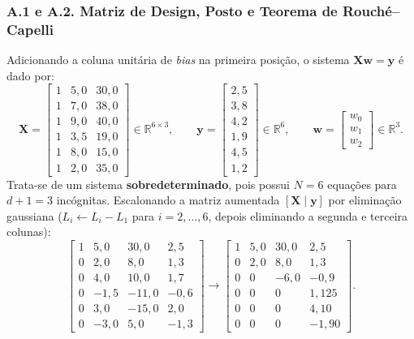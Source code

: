 \documentclass[11pt,a4paper]{article}
\begin{document}
\subsubsection*{A.1 e A.2. Matriz de Design, Posto e Teorema de Rouché--Capelli}
Adicionando a coluna unitária de \textit{bias} na primeira posição, o sistema $\mathbf{X}\mathbf{w} = \mathbf{y}$ é dado por:
\[
\mathbf{X} = \begin{bmatrix}
1 & 5{,}0 & 30{,}0 \\
1 & 7{,}0 & 38{,}0 \\
1 & 9{,}0 & 40{,}0 \\
1 & 3{,}5 & 19{,}0 \\
1 & 8{,}0 & 15{,}0 \\
1 & 2{,}0 & 35{,}0
\end{bmatrix} \in \mathbb{R}^{6 \times 3}, \qquad
\mathbf{y} = \begin{bmatrix} 2{,}5 \\ 3{,}8 \\ 4{,}2 \\ 1{,}9 \\ 4{,}5 \\ 1{,}2 \end{bmatrix} \in \mathbb{R}^6, \qquad
\mathbf{w} = \begin{bmatrix} w_0 \\ w_1 \\ w_2 \end{bmatrix} \in \mathbb{R}^3.
\]
Trata-se de um sistema \textbf{sobredeterminado}, pois possui $N = 6$ equações para $d + 1 = 3$ incógnitas. Escalonando a matriz aumentada $[\mathbf{X} \mid \mathbf{y}]$ por eliminação gaussiana ($L_i \leftarrow L_i - L_1$ para $i=2,\dots,6$, depois eliminando a segunda e terceira colunas):
\[
\left[\begin{array}{ccc|c}
1 & 5{,}0 & 30{,}0 & 2{,}5 \\
0 & 2{,}0 & 8{,}0 & 1{,}3 \\
0 & 4{,}0 & 10{,}0 & 1{,}7 \\
0 & -1{,}5 & -11{,}0 & -0{,}6 \\
0 & 3{,}0 & -15{,}0 & 2{,}0 \\
0 & -3{,}0 & 5{,}0 & -1{,}3
\end{array}\right]
\longrightarrow
\left[\begin{array}{ccc|c}
1 & 5{,}0 & 30{,}0 & 2{,}5 \\
0 & 2{,}0 & 8{,}0 & 1{,}3 \\
0 & 0 & -6{,}0 & -0{,}9 \\
0 & 0 & 0 & 1{,}125 \\
0 & 0 & 0 & 4{,}10 \\
0 & 0 & 0 & -1{,}90
\end{array}\right].
\]
\end{document}
